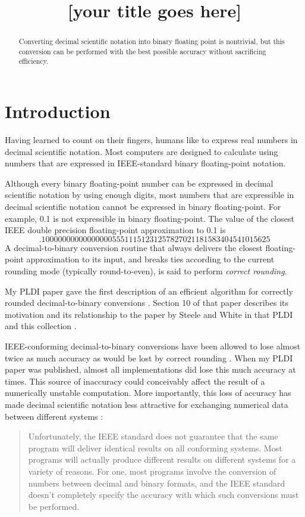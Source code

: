 \documentclass{sigplanconf}
\title{[your title goes here]}
\begin{document}
\maketitle

\begin{abstract}
Converting decimal scientific notation into binary
floating point is nontrivial, but this conversion can
be performed with the best possible accuracy without
sacrificing efficiency.
\end{abstract}

\section{Introduction}

Having learned to count on their fingers, humans like
to express real numbers in decimal scientific notation.
Most computers are designed to calculate using numbers
that are expressed in IEEE-standard binary floating-point
notation.

Although every binary floating-point number can be expressed
in decimal scientific notation by using enough digits, most
numbers that are expressible in decimal scientific notation
cannot be expressed in binary floating-point.  For example,
0.1 is not expressible in binary floating-point.  The value
of the closest IEEE double precision floating-point
approximation to 0.1 is
\[
  .1000000000000000055511151231257827021181583404541015625
\]
A decimal-to-binary conversion routine that always delivers
the closest floating-point approximation to its input, and
breaks ties according to the current rounding mode (typically
round-to-even), is said to perform \emph{correct rounding}.

My PLDI paper gave the first description of an efficient
algorithm for correctly rounded decimal-to-binary conversions
\cite{Clinger:1990:HRF}.
Section 10 of that paper describes its motivation and its
relationship to the paper by Steele and White in that PLDI
and this collection \cite{Steele:1990:HPF}.

IEEE-conforming decimal-to-binary conversions have been allowed
to lose almost twice as much accuracy as would be lost by correct
rounding \cite{IEEE-754}.  When my PLDI paper was published, almost
all implementations did lose this much accuracy at times.
This source of inaccuracy could conceivably affect the result
of a numerically unstable computation.  More importantly,
this loss of accuracy has made decimal scientific notation less
attractive for exchanging numerical data between different
systems \cite{priest-appendixD}:
\begin{quote}
Unfortunately, the IEEE standard does not guarantee that the
same program will deliver identical results on all conforming
systems.  Most programs will actually produce different results
on different systems for a variety of reasons.  For one, most
programs involve the conversion of numbers between decimal and
binary formats, and the IEEE standard doesn't completely specify
the accuracy with which such conversions must be performed.
\end{quote}
\end{document}
